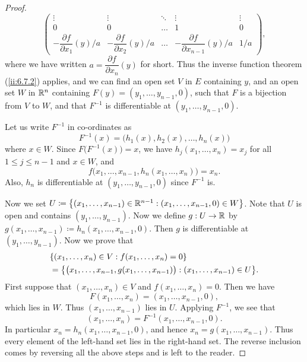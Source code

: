 \begin{proof}
\[\begin{pmatrix}
      \vdots                                   & \vdots                                   & \ddots & \vdots                                         & \vdots \\
      0                                        & 0                                        & \dots  & 1                                              & 0      \\
      -\dfrac{\partial f}{\partial x_1}(y) / a & -\dfrac{\partial f}{\partial x_2}(y) / a & \dots  & -\dfrac{\partial f}{\partial x_{n - 1}}(y) / a & 1 / a
    \end{pmatrix},
  \]
  where we have written \(a = \dfrac{\partial f}{\partial x_n}(y)\) for short.
  Thus the inverse function theorem (\cref{ii:6.7.2}) applies, and we can find an open set \(V\) in \(E\) containing \(y\), and an open set \(W\) in \(\mathbb{R}^n\) containing \(F(y) = (y_1, \dots, y_{n - 1}, 0)\), such that \(F\) is a bijection from \(V\) to \(W\), and that \(F^{-1}\) is differentiable at \((y_1, \dots, y_{n - 1}, 0)\).

  Let us write \(F^{-1}\) in co-ordinates as
  \[
    F^{-1}(x) = \big(h_1(x), h_2(x), \dots, h_n(x)\big)
  \]
  where \(x \in W\).
  Since \(F\big(F^{-1}(x)\big) = x\), we have \(h_j(x_1, \dots, x_n) = x_j\) for all \(1 \leq j \leq n - 1\) and \(x \in W\), and
  \[
    f\big(x_1, \dots, x_{n - 1}, h_n(x_1, \dots, x_n)\big) = x_n.
  \]
  Also, \(h_n\) is differentiable at \((y_1, \dots, y_{n - 1}, 0)\) since \(F^{-1}\) is.

  Now we set \(U \coloneqq \left\lbrace(x_1, \dots, x_{n - 1}) \in \mathbb{R}^{n - 1} : (x_1, \dots, x_{n - 1}, 0) \in W\right\rbrace\).
  Note that \(U\) is open and contains \((y_1, \dots, y_{n - 1})\).
  Now we define \(g : U \to \mathbb{R}\) by \(g(x_1, \dots, x_{n - 1}) \coloneqq h_n(x_1, \dots, x_{n - 1}, 0)\).
  Then \(g\) is differentiable at \((y_1, \dots, y_{n - 1})\).
  Now we prove that
  \begin{align*}
     & \set{(x_1, \dots, x_n) \in V : f(x_1, \dots, x_n) = 0}                                             \\
     & = \set{\big(x_1, \dots, x_{n - 1}, g(x_1, \dots, x_{n - 1})\big) : (x_1, \dots, x_{n - 1}) \in U}.
  \end{align*}
  First suppose that \((x_1, \dots, x_n) \in V\) and \(f(x_1, \dots, x_n) = 0\).
  Then we have
  \[
    F(x_1, \dots, x_n) = (x_1, \dots, x_{n - 1}, 0),
  \]
  which lies in \(W\).
  Thus \((x_1, \dots, x_{n - 1})\) lies in \(U\).
  Applying \(F^{-1}\), we see that
  \[
    (x_1, \dots, x_n) = F^{-1}(x_1, \dots, x_{n - 1}, 0).
  \]
  In particular \(x_n = h_n(x_1, \dots, x_{n - 1}, 0)\), and hence \(x_n = g(x_1, \dots, x_{n - 1})\).
  Thus every element of the left-hand set lies in the right-hand set.
  The reverse inclusion comes by reversing all the above steps and is left to the reader.


\end{proof}
